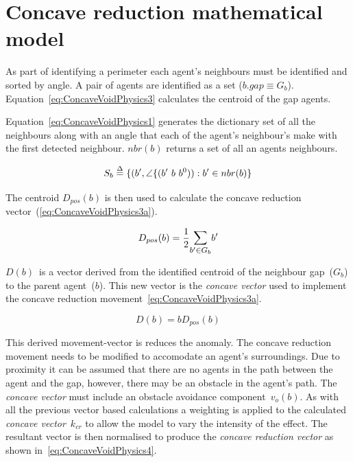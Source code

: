 \documentclass{ieeeaccess}
\begin{document}
\section{Concave reduction mathematical model}\label{concave:ConcaveVoidReduction1}
As part of identifying a perimeter each agent's neighbours must be identified and sorted by angle. A pair of agents are identified as a set ($b.gap \equiv G_b$). Equation~\ref{eq:ConcaveVoidPhysics3} calculates the centroid of the gap agents. 

Equation~\ref{eq:ConcaveVoidPhysics1} generates the dictionary set of all the neighbours along with an angle that each of the agent's neighbour's make with the first detected neighbour. $nbr(b)$ returns a set of all an agents neighbours.

\begin{equation}
\label{eq:ConcaveVoidPhysics1}
S_b \buildrel \Delta \over = \{(b',\angle\{(b'~b~b^0)) : b' \in nbr(b)\}
\end{equation}

The centroid $D_{pos}(b)$ is then used to calculate the concave reduction vector~(\ref{eq:ConcaveVoidPhysics3a}).

\begin{equation}
\label{eq:ConcaveVoidPhysics3}
D_{pos}(b) = \frac{1}{2}\mathlarger{\sum_{b' \in G_b}}{b'} 
\end{equation}

$D(b)$~is a vector derived from the identified centroid of the neighbour gap~($G_b$) to the parent agent~($b$). This new vector is the \textit{concave vector} used to implement the concave reduction movement~\ref{eq:ConcaveVoidPhysics3a}.

\begin{equation}\label{eq:ConcaveVoidPhysics3a}
D(b) = bD_{pos}(b) 
\end{equation}

This derived movement-vector is reduces the anomaly. The concave reduction movement needs to be modified to accomodate an agent's surroundings. Due to proximity it can be assumed that there are no agents in the path between the agent and the gap, however, there may be an obstacle in the agent's path. The \textit{concave vector} must include an obstacle avoidance component~$v_o(b)$. As with all the previous vector based calculations a weighting is applied to the calculated \textit{concave vector}~$k_{cr}$ to allow the model to vary the intensity of the effect. The resultant vector is then normalised to produce the \textit{concave reduction vector} as shown in~\ref{eq:ConcaveVoidPhysics4}. 
\end{document}
